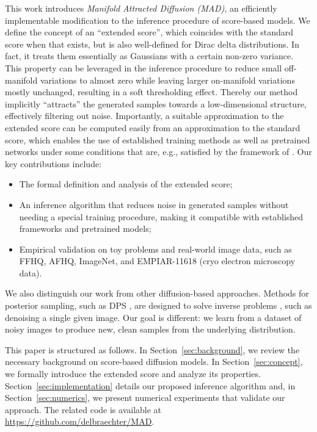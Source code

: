 \documentclass{article}
\theoremstyle{plain}
\theoremstyle{definition}
\theoremstyle{remark}
\begin{document}
This work introduces \textit{Manifold Attracted Diffusion (MAD)}, an efficiently implementable modification to the inference procedure of score-based models. We define the concept of an ``extended score'', which coincides with the standard score when that exists, but is also well-defined for Dirac delta distributions. In fact, it treats them essentially as Gaussians with a certain non-zero variance. This property can be leveraged in the inference procedure to reduce small off-manifold variations to almost zero while leaving larger on-manifold variations mostly unchanged, resulting in a soft thresholding effect. Thereby our method implicitly ``attracts'' the generated samples towards a low-dimensional structure, effectively filtering out noise.
Importantly, a suitable approximation to the extended score can be computed easily from an approximation to the standard score, which enables the use of established training methods as well as pretrained networks under some conditions that are, e.g., satisfied by the framework of \cite{edm}.
Our key contributions include:
\begin{itemize}[leftmargin=4mm]
    \item The formal definition and analysis of the extended score;
    \item An inference algorithm that reduces noise in generated samples without needing a special training procedure, making it compatible with established frameworks and pretrained models;
    \item Empirical validation on toy problems and real-world image data, such as FFHQ, AFHQ, ImageNet, and EMPIAR-11618 (cryo electron microscopy data).
\end{itemize}

We also distinguish our work from other diffusion-based approaches. Methods for posterior sampling, such as DPS \citep{chungdiffusion,chung2022improving}, are designed to solve inverse problems \citep{DBLP:journals/corr/abs-2410-00083}, such as denoising a single given image. Our goal is different: we learn from a dataset of noisy images to produce new, clean samples from the underlying distribution.



This paper is structured as follows. In Section~\ref{sec:background}, we review the necessary background on score-based diffusion models. In Section~\ref{sec:concept}, we formally introduce the extended score and analyze its properties. Section~\ref{sec:implementation} details our proposed inference algorithm and, in Section~\ref{sec:numerics}, we present numerical experiments that validate our approach. The related code is available at \url{https://github.com/delbraechter/MAD}.
\end{document}
